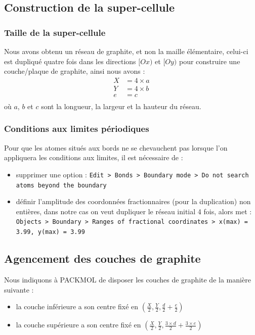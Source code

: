\documentclass[11pt, a4paper]{article}
\begin{document}
	\subsection{Construction de la super-cellule}

		\subsubsection{Taille de la super-cellule}

Nous avons obtenu un réseau de graphite, et non la maille élémentaire, celui-ci est dupliqué quatre fois dans les directions $[Ox)$ et $[Oy)$ pour construire une couche/plaque de graphite, ainsi nous avons :
\begin{align*}
	X &= \num{4} \times a\\
	Y &= \num{4} \times b\\
	e &= c\\
\end{align*}
où $a$, $b$ et $c$ sont la longueur, la largeur et la hauteur du réseau.

		\subsubsection{Conditions aux limites périodiques}

Pour que les atomes situés aux bords ne se chevauchent pas lorsque l'on appliquera les conditions aux limites, il est nécessaire de :
\begin{itemize}
	\item supprimer une option : \lstinline!Edit > Bonds > Boundary mode > Do not search atoms beyond the boundary!
	\item définir l'amplitude des coordonnées fractionnaires (pour la duplication) non entières, dans notre cas on veut dupliquer le réseau initial \num{4} fois, alors met : \lstinline!Objects > Boundary > Ranges of fractional coordinates > x(max) = 3.99, y(max) = 3.99!
\end{itemize}

	\subsection{Agencement des couches de graphite}

Nous indiquons à PACKMOL de disposer les couches de graphite de la manière suivante :
\begin{itemize}
	\item la couche inférieure a son centre fixé en $(\frac{X}{2}, \frac{Y}{2}, \frac{d}{2} + \frac{e}{2})$
	\item la couche supérieure a son centre fixé en $(\frac{X}{2}, \frac{Y}{2}, \frac{3 \times d}{2} + \frac{3 \times e}{2})$
\end{itemize}
\end{document}
